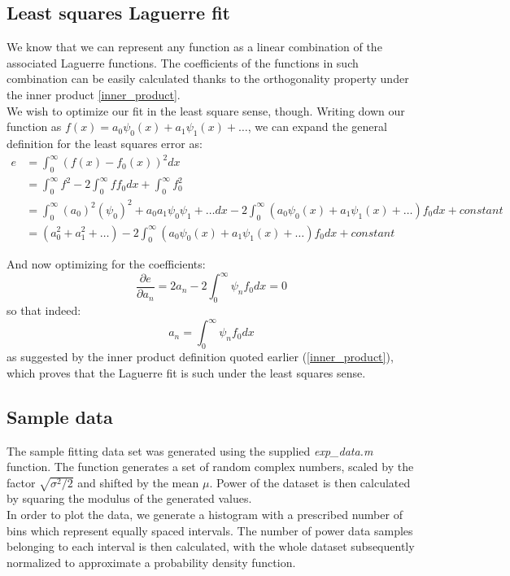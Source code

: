 \documentclass[a4paper]{article}
\numberwithin{equation}{section}
\begin{document}
\subsection{Least squares Laguerre fit}
We know that we can represent any function as a linear combination of the associated Laguerre functions. The coefficients of the functions in such combination can be easily calculated thanks to the orthogonality property under the inner product \ref{inner_product}.\\
We wish to optimize our fit in the least square sense, though. Writing down our function as $f(x)=a_0\psi_0(x)+a_1\psi_1(x)+\ldots$, we can expand the general definition for the least squares error as:
\begin{align}
e &= \int_{0}^{\infty} (f(x)-f_0(x))^2dx \\
  &= \int_{0}^{\infty} f^2 - 2 \int_{0}^{\infty} f f_0 dx + \int_{0}^{\infty} f_0^2 \\
  &= \int_{0}^{\infty} (a_0)^2(\psi_0)^2 + a_0a_1\psi_0\psi_1 + \ldots dx - 2 \int_{0}^{\infty} (a_0\psi_0(x)+a_1\psi_1(x)+\ldots)f_0 dx + constant \\
  &= (a_0^2+a_1^2+\ldots) - 2 \int_{0}^{\infty} (a_0\psi_0(x)+a_1\psi_1(x)+\ldots)f_0 dx + constant
\end{align}

\noindent And now optimizing for the coefficients:
\begin{equation}
\frac{\partial e}{\partial a_n} = 2a_n - 2 \int_{0}^{\infty} \psi_nf_0dx = 0
\end{equation}
so that indeed:
\begin{equation}
a_n = \int_{0}^{\infty} \psi_nf_0dx
\end{equation}
as suggested by the inner product definition quoted earlier (\ref{inner_product}), which proves that the Laguerre fit is such under the least squares sense.

\subsection{Sample data}
The sample fitting data set was generated using the supplied \textit{exp\_data.m} function.
The function generates a set of random complex numbers, scaled by the factor $\sqrt{\sigma^2/2}$ and shifted by the mean $\mu$. Power of the dataset is then calculated by squaring the modulus of the generated values. \\
In order to plot the data, we generate a histogram with a prescribed number of bins which represent equally spaced intervals. The number of power data samples belonging to each interval is then calculated, with the whole dataset subsequently normalized to approximate a probability density function.
\end{document}
